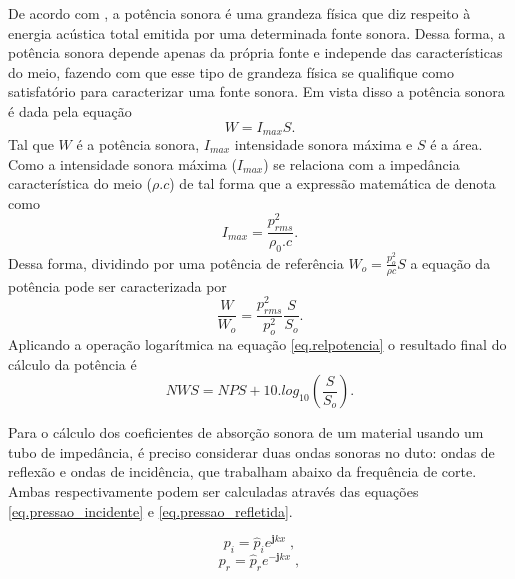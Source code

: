 De acordo com \cite{potencia}, a potência sonora é uma grandeza física que diz respeito à energia acústica total emitida por uma determinada fonte sonora. Dessa forma, a potência sonora depende apenas da própria fonte e independe das características do meio, fazendo com que esse tipo de grandeza física se qualifique como satisfatório para caracterizar uma fonte sonora. Em vista disso a potência sonora é dada pela equação
\begin{equation}
W = I_{max}S.
\label{eq.potencia}
\end{equation}
Tal que $W$ é a potência sonora, $I_{max}$ intensidade sonora máxima e $S$ é a área. Como a intensidade sonora máxima ($I_{max}$) se relaciona com a impedância característica do meio ($\rho . c$) de tal forma que a expressão matemática de denota como \begin{equation}
I_{max}=\frac{p_{rms}^{2}}{\rho_{0} . c}.
\label{eq.intensidade}
\end{equation}
Dessa forma, dividindo por uma potência de referência $W_{o}= \frac{p_{o}^{2}}{\rho c}S $ a equação da potência pode ser caracterizada por
 \begin{equation}
	\frac{W}{W_{o}}=\frac{p_{rms}^{2}}{p_{o}^{2}}\frac{S}{S_{o}}.
\label{eq.relpotencia}
\end{equation}
Aplicando a operação logarítmica na equação \ref{eq.relpotencia} o resultado final do cálculo da potência é
\begin{equation}
	NWS = NPS + 10 . log_{10}\left(\frac{S}{S_{o}}\right).
\end{equation}


Para o cálculo dos coeficientes de absorção sonora de um material usando um tubo de impedância, é preciso considerar duas ondas sonoras no duto: ondas de reflexão e ondas de incidência, que trabalham abaixo da frequência de corte. Ambas respectivamente podem ser calculadas através das equações \ref{eq.pressao_incidente} e \ref{eq.pressao_refletida}.

\begin{equation}
p_{i}=\widehat{p}_{i}e^{\textbf{j}kx}\;,
\label{eq.pressao_incidente}
\end{equation}
\begin{equation}
p_{r}=\widehat{p}_{r}e^{-\textbf{j}kx}\;,
\label{eq.pressao_refletida}
\end{equation}

